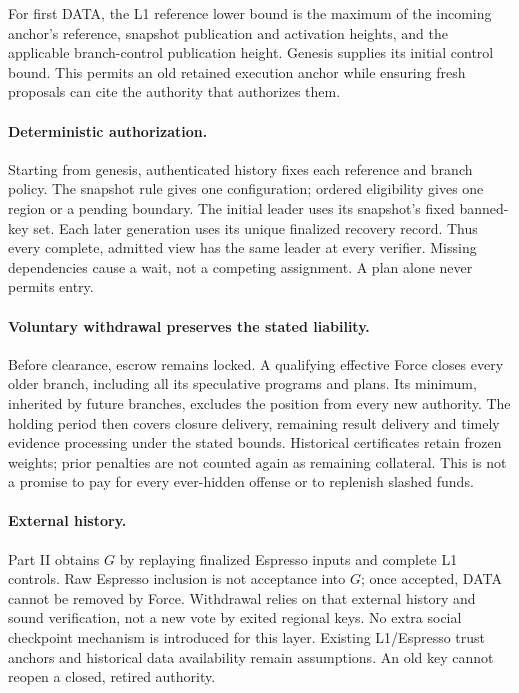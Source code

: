 \documentclass[11pt,a4paper]{article}
\begin{document}
For first DATA, the L1 reference lower bound is the maximum of the
incoming anchor's reference, snapshot publication and activation heights,
and the applicable branch-control publication height. Genesis supplies
its initial control bound. This permits an old retained execution anchor
while ensuring fresh proposals can cite the authority that authorizes them.

\paragraph{Deterministic authorization.}
Starting from genesis, authenticated history fixes each reference and
branch policy. The snapshot rule gives one configuration; ordered
eligibility gives one region or a pending boundary. The initial leader
uses its snapshot's fixed banned-key set. Each later generation uses its
unique finalized recovery record. Thus every complete, admitted view has
the same leader at every verifier. Missing dependencies cause a wait,
not a competing assignment. A plan alone never permits entry.

\paragraph{Voluntary withdrawal preserves the stated liability.}
Before clearance, escrow remains locked. A qualifying effective Force
closes every older branch, including all its speculative programs and
plans. Its minimum, inherited by future branches, excludes the position
from every new authority. The holding period then covers closure delivery,
remaining result delivery and timely evidence processing under the stated
bounds. Historical certificates retain frozen weights; prior penalties
are not counted again as remaining collateral. This is not a promise to
pay for every ever-hidden offense or to replenish slashed funds.

\paragraph{External history.}
Part II obtains $G$ by replaying finalized Espresso inputs and complete
L1 controls. Raw Espresso inclusion is not acceptance into $G$; once
accepted, DATA cannot be removed by Force. Withdrawal relies on that
external history and sound verification, not a new vote by exited regional
keys. No extra social checkpoint mechanism is introduced for this layer.
Existing L1/Espresso trust anchors and historical data availability remain
assumptions. An old key cannot reopen a closed, retired authority.
\end{document}
